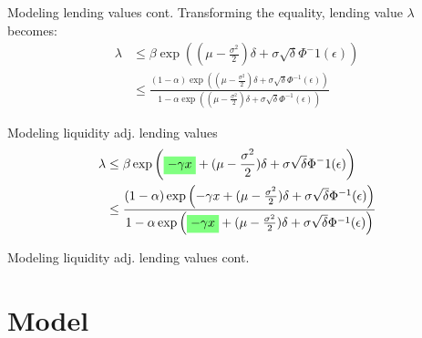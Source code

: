 \documentclass[compress, 10pt, notes]{beamer}  %
\newcommand{\highlightgreen}[1]{%
  \colorbox{green!50}{$\displaystyle#1$}
  }
\begin{document}
\begin{frame}{Modeling lending values cont.}
    Transforming the equality, lending value $\lambda$ becomes:
    \begin{align*}
        \lambda &\leq \beta \exp \left( (\mu - \frac{\sigma ^2}{2})\delta + \sigma \sqrt{\delta} \Phi^-1 (\epsilon) \right) \\
        &\leq \frac{(1-\alpha)\exp \left( (\mu - \frac{\sigma ^2}{2})\delta + \sigma \sqrt{\delta} \Phi^{-1} (\epsilon) \right)}{1-\alpha \exp \left( (\mu - \frac{\sigma ^2}{2})\delta + \sigma \sqrt{\delta} \Phi^{-1} (\epsilon) \right)}
    \end{align*}
\end{frame}

\begin{frame}{Modeling liquidity adj. lending values}
    \begin{align*}
        \lambda &\leq \beta \exp \left( \highlightgreen{-\gamma x} + (\mu - \frac{\sigma ^2}{2})\delta + \sigma \sqrt{\delta} \Phi^-1 (\epsilon) \right) \\
        &\leq \frac{(1-\alpha)\exp \left( -\gamma x + (\mu - \frac{\sigma ^2}{2})\delta + \sigma \sqrt{\delta} \Phi^{-1} (\epsilon) \right)}{1-\alpha \exp \left( \highlightgreen{-\gamma x} + (\mu - \frac{\sigma ^2}{2})\delta + \sigma \sqrt{\delta} \Phi^{-1} (\epsilon) \right)}
    \end{align*}
\end{frame}

\begin{frame}{Modeling liquidity adj. lending values cont.}
    
\end{frame}
\section{Model}
\end{document}
